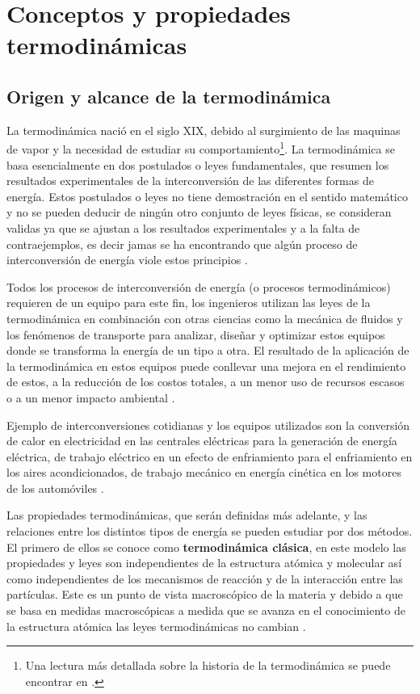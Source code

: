 \documentclass[master.tex]{subfiles}
\begin{document}
\section{Conceptos y propiedades termodinámicas}

\subsection{Origen y alcance de la termodinámica}

    La termodinámica nació en el siglo XIX, debido al surgimiento de las maquinas de vapor y la necesidad de estudiar su comportamiento\footnote{Una lectura más detallada sobre la historia de la termodinámica se puede encontrar en \cite{clavell}.}. La termodinámica se basa esencialmente en dos postulados o leyes fundamentales, que resumen los resultados experimentales de la interconversión de las diferentes formas de energía. Estos postulados o leyes no tiene demostración en el sentido matemático y no se pueden deducir de ningún otro conjunto de leyes físicas, se consideran validas ya que se ajustan a los resultados experimentales y a la falta de contraejemplos, es decir jamas se ha encontrando que algún proceso de interconversión de energía viole estos principios \parencites{glasstone}{smith-vanness}. 
    
    Todos los procesos de interconversión de energía (o procesos termodinámicos) requieren de un equipo para este fin, los ingenieros utilizan las leyes de la termodinámica en combinación con otras ciencias como la mecánica de fluidos y los fenómenos de transporte para analizar, diseñar y optimizar estos equipos donde se transforma la energía de un tipo a otra. El resultado de la aplicación de la termodinámica en estos equipos puede conllevar una mejora en el rendimiento de estos, a la reducción de los costos totales, a un menor uso de recursos escasos o a un menor impacto ambiental \parencites{wark}{moranshapiro}.
    
    Ejemplo de interconversiones cotidianas y los equipos utilizados son la conversión de calor en electricidad en las centrales eléctricas para la generación de energía eléctrica, de trabajo eléctrico en un efecto de enfriamiento para el enfriamiento en los aires acondicionados, de trabajo mecánico en energía cinética en los motores de los automóviles \parencite{faires}.

    Las propiedades termodinámicas, que serán definidas más adelante, y las relaciones entre los distintos tipos de energía se pueden estudiar por dos métodos. El primero de ellos se conoce como \textbf{termodinámica clásica}, en este modelo las propiedades y leyes son independientes de la estructura atómica y molecular así como independientes de los mecanismos de reacción y de la interacción entre las partículas. Este es un punto de vista macroscópico de la materia y debido a que se basa en medidas macroscópicas a medida que se avanza en el conocimiento de la estructura atómica las leyes termodinámicas no cambian \parencites{faires}{glasstone}{wark}.
\end{document}
